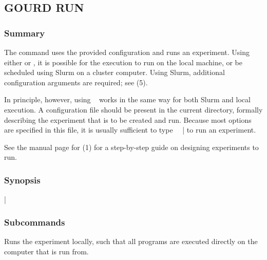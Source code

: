 \documentclass[a4paper,english]{article}
\begin{document}
\begin{adjustwidth}{18pt}{0pt}
        \subsection{GOURD RUN}

            \subsubsection{Summary}
                The   command uses the provided configuration and runs an
                experiment.
                Using either  or , it is possible for the execution
                to run on the local machine, or be scheduled using Slurm on a cluster computer.
                Using Slurm, additional configuration arguments are required; see
                (5).

                In principle, however, using ~ works in the same way for both
                Slurm and local execution.
                A  configuration file should be present in the current directory,
                formally describing the experiment that is to be created and run.
                Because most options are specified in this file, it is usually sufficient to type
                ~~| to run an experiment.

                See the manual page for (1) for a step-by-step guide on
                designing experiments to run.


            \subsubsection{Synopsis}
                |

            \subsubsection{Subcommands}
                \begin{Description}[Subcommands]
                    \item[\Arg{local}]
                        Runs the experiment locally, such that all programs are executed directly on the computer
                        that  is run from.


\end{Description}
\end{adjustwidth}
\end{document}
